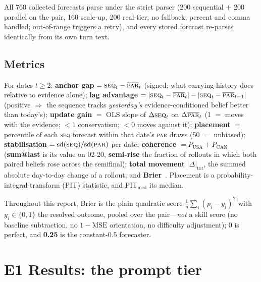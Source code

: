 \documentclass[10pt]{article}
\newcommand{\seq}{\textsc{seq}}
\newcommand{\pl}{\textsc{par}}
\begin{document}
All 760 collected forecasts parse under the strict parser (200 sequential $+$ 200 parallel on the
pair, 160 scale-up, 200 real-tier; no fallback; percent and comma handled; out-of-range triggers
a retry), and every stored forecast re-parses identically from its own turn text.

\subsection{Metrics}
For dates $t\ge2$: \textbf{anchor gap} $=\seq_t-\overline{\pl}_t$ (signed; what carrying history
does relative to evidence alone); \textbf{lag advantage} $=|\seq_t-\overline{\pl}_t| -
|\seq_t-\overline{\pl}_{t-1}|$ (positive $\Rightarrow$ the sequence tracks \emph{yesterday's}
evidence-conditioned belief better than today's); \textbf{update gain} $=$ OLS slope of
$\Delta\seq_t$ on $\Delta\overline{\pl}_t$ (1 $=$ moves with the evidence; $<\!1$ conservatism;
$<\!0$ moves against it); \textbf{placement} $=$ percentile of each \seq{} forecast within that
date's \pl{} draws (50 $=$ unbiased); \textbf{stabilisation} $=\mathrm{sd}(\seq)/\mathrm{sd}(\pl)$
per date; \textbf{coherence} $=P_\text{USA}{+}P_\text{CAN}$ (\textbf{sum@last} is its value on
02-20, \textbf{semi-rise} the fraction of rollouts in which both paired beliefs rose across the
semifinal); \textbf{total movement} $|\Delta|_\text{tot}$, the summed absolute day-to-day change
of a rollout; and \textbf{Brier}~\cite{brier}. Placement is a probability-integral-transform (PIT)
statistic, and PIT$_{\mathrm{med}}$ its median.

Throughout this report, Brier is the plain quadratic score $\frac1n\sum_i(p_i-y_i)^2$ with
$y_i\in\{0,1\}$ the resolved outcome, pooled over the pair---\emph{not} a skill score (no baseline
subtraction, no $1{-}\mathrm{MSE}$ orientation, no difficulty adjustment); 0 is perfect, and
\textbf{0.25} is the constant-$0.5$ forecaster.

\section{E1 Results: the prompt tier}\label{sec:e1res}
\end{document}
